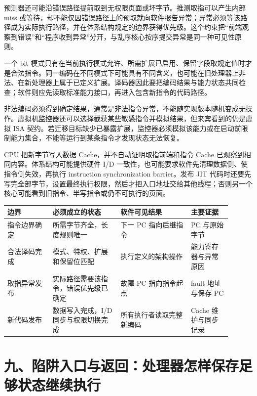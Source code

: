 预测器还可能沿错误路径提前取到无权限页面或坏字节。推测取指可以产生内部 miss 或等待，却不能仅因错误路径上的预取就向软件报告异常；异常必须等该路径成为实际执行路径，并在体系结构规定的边界获得优先级。这个约束把“前端观察到错误”和“程序收到异常”分开，与乱序核心按序提交异常是同一种可见性原则。


一个 bit 模式只有在当前执行模式允许、所需扩展已启用、保留字段取规定值时才是合法指令。同一编码在不同模式下可能具有不同含义，也可能在旧处理器上非法、在新处理器上属于已定义扩展。译码器因此要把编码结果与能力状态共同检查；软件则应先读取标准能力接口，再进入包含新指令的代码路径。

非法编码必须得到确定结果，通常是非法指令异常，不能随实现版本随机变成无操作。虚拟机监控器还可以选择截获某些敏感指令并模拟结果，但来宾看到的仍是虚拟 ISA 契约。若迁移目标缺少已暴露扩展，监控器必须模拟该能力或在启动前限制能力集合，不能等运行到某条指令才发现状态无法恢复。


CPU 把新字节写入数据 Cache，并不自动证明取指前端和指令 Cache 已观察到相同内容。体系结构可能提供硬件 I/D 一致性，也可能要求软件先清理数据侧、使指令侧失效，再执行 instruction synchronization barrier。发布 JIT 代码时还要先写完全部字节，设置最终执行权限，然后才把入口地址交给其他线程；否则另一个核心可能看到旧指令、半写指令或仍不可执行的页面。

\begin{longtable}{L{0.18\linewidth}L{0.27\linewidth}L{0.29\linewidth}L{0.16\linewidth}}
\toprule
边界 & 必须成立的状态 & 软件可见结果 & 主要证据 \\
\midrule
指令边界确定 & 所需字节齐全，长度规则唯一 & 下一 PC 指向后继指令 & PC 与原始字节 \\\tablerowrule
合法译码完成 & 模式、特权、扩展和保留位匹配 & 执行定义的架构操作 & 能力寄存器与异常原因 \\\tablerowrule
取指异常发布 & 实际路径需要该指令，错误优先级已确定 & 故障 PC 指向指令起点 & fault 地址与保存 PC \\\tablerowrule
新代码发布 & 数据写入完成，I/D 同步与权限切换完成 & 所有执行者读取完整新编码 & Cache 维护与同步记录 \\
\bottomrule
\end{longtable}

\section{九、陷阱入口与返回：处理器怎样保存足够状态继续执行}

